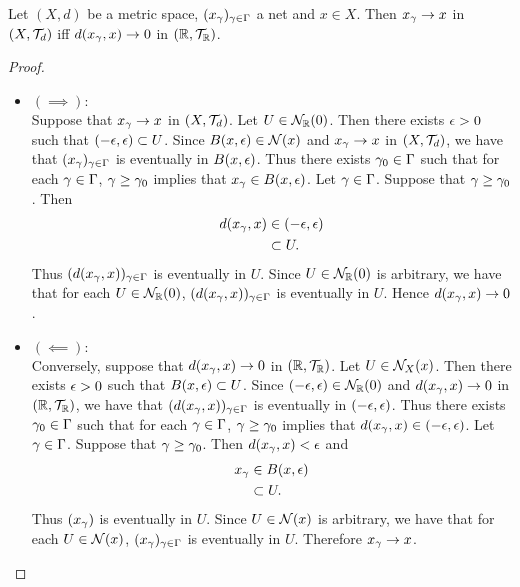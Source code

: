 \documentclass{book}
\begin{document}
\begin{ex} 
	Let $(X, d)$ be a metric space, $(x_{\gamma})_{\gamma \in \Gamma}$ a net and $x \in X$. Then $x_{\gamma} \rightarrow x$ in $(X, \mathcal{T}_d)$ iff $d(x_{\gamma}, x) \rightarrow 0$ in $(\mathbb{R}, \mathcal{T}_{\mathbb{R}})$. 
\end{ex}

\begin{proof}\
	\begin{itemize}
		\item $(\implies):$ \\
		Suppose that $x_{\gamma} \rightarrow x$ in $(X, \mathcal{T}_d)$. Let $U \in \mathcal{N}_{\mathbb{R}}(0)$. Then there exists $\epsilon > 0$ such that $(-\epsilon, \epsilon) \subset U$. Since $B(x, \epsilon) \in \mathcal{N}(x)$ and $x_{\gamma} \rightarrow x$ in $(X, \mathcal{T}_d)$, we have that $(x_{\gamma})_{\gamma \in \Gamma}$ is eventually in $B(x, \epsilon)$. Thus there exists $\gamma_0 \in \Gamma$ such that for each $\gamma \in \Gamma$, $\gamma \geq \gamma_0$ implies that $x_{\gamma} \in B(x, \epsilon)$. Let $\gamma \in \Gamma$. Suppose that $\gamma \geq \gamma_0$. Then 
		\begin{align*}
			d(x_{\gamma}, x) 
			& \in (-\epsilon, \epsilon) \\
			& \subset U.
		\end{align*}
		Thus $(d(x_{\gamma}, x))_{\gamma \in \Gamma}$ is eventually in $U$. Since $U \in \mathcal{N}_{\mathbb{R}}(0)$ is arbitrary, we have that for each $U \in \mathcal{N}_{\mathbb{R}}(0)$, $(d(x_{\gamma}, x))_{\gamma \in \Gamma}$ is eventually in $U$. Hence $d(x_{\gamma}, x) \rightarrow 0$.
		\item $(\impliedby):$ \\
		Conversely, suppose that $d(x_{\gamma}, x) \rightarrow 0$ in $(\mathbb{R}, \mathcal{T}_{\mathbb{R}})$. Let $U \in \mathcal{N}_X(x)$. Then there exists $\epsilon > 0$ such that $B(x, \epsilon) \subset U$. Since $(-\epsilon, \epsilon) \in \mathcal{N}_{\mathbb{R}}(0)$ and $d(x_{\gamma}, x) \rightarrow 0$ in $(\mathbb{R}, \mathcal{T}_{\mathbb{R}})$, we have that $(d(x_{\gamma}, x))_{\gamma \in \Gamma}$ is eventually in $(-\epsilon, \epsilon)$. Thus there exists $\gamma_0 \in \Gamma$ such that for each $\gamma \in \Gamma$, $\gamma \geq \gamma_0$ implies that $d(x_{\gamma}, x) \in (-\epsilon, \epsilon)$. Let $\gamma \in \Gamma$. Suppose that $\gamma \geq \gamma_0$. Then $d(x_{\gamma}, x) < \epsilon$ and 
		\begin{align*}
			x_{\gamma} 
			& \in B(x, \epsilon) \\
			& \subset U. 
		\end{align*} 
		Thus $(x_{\gamma})$ is eventually in $U$. Since $U \in \mathcal{N}(x)$ is arbitrary, we have that for each $U \in \mathcal{N}(x)$, $(x_{\gamma})_{\gamma \in \Gamma}$ is eventually in $U$. Therefore $x_{\gamma} \rightarrow x$.  
	\end{itemize}
\end{proof}
\end{document}
